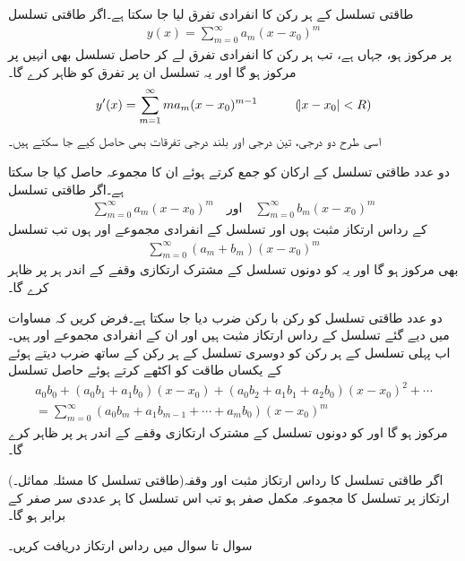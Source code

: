 \quad طاقتی تسلسل کے ہر رکن کا انفرادی تفرق لیا جا سکتا ہے۔اگر طاقتی تسلسل
\begin{align*}
y(x)=\sum_{m=0}^{\infty}a_m(x-x_0)^m
\end{align*}
  پر مرکوز ہو، جہاں  ہے، تب ہر رکن کا انفرادی تفرق لے کر حاصل تسلسل بھی انہیں  پر مرکوز ہو گا اور یہ تسلسل ان  پر  تفرق   کو ظاہر کرے گا۔ 
 \begin{align*}
y'(x)=\sum_{m=1}^{\infty} ma_m(x-x_0)^{m-1}\quad \quad \quad (\abs{x-x_0}<R)
\end{align*}
 اسی طرح دو درجی، تین درجی اور بلند درجی تفرقات بھی حاصل کیے جا سکتے ہیں۔

\quad دو عدد طاقتی تسلسل کے ارکان کو جمع کرتے ہوئے ان کا مجموعہ حاصل کیا جا سکتا ہے۔اگر طاقتی تسلسل
\begin{align}\label{مساوات_بیسل_دو_عدد_تسلسل_الف}
\sum_{m=0}^{\infty} a_m(x-x_0)^m\quad \text{اور} \quad \sum_{m=0}^{\infty} b_m(x-x_0)^m
\end{align}
کے رداس ارتکاز مثبت ہوں اور تسلسل کے انفرادی مجموعے  اور  ہوں تب تسلسل
\begin{align*}
\sum_{m=0}^{\infty} (a_m+b_m)(x-x_0)^m
\end{align*}
بھی مرکوز ہو گا اور یہ  کو  دونوں تسلسل کے مشترک ارتکازی وقفے کے اندر ہر  پر ظاہر کرے گا۔

\quad دو عدد طاقتی تسلسل کو رکن با رکن ضرب دیا جا سکتا ہے۔فرض کریں کہ مساوات  میں دیے گئے تسلسل کے رداس ارتکاز مثبت ہیں اور ان کے انفرادی مجموعے  اور  ہیں۔اب پہلی تسلسل کے ہر رکن کو دوسری تسلسل کے ہر رکن کے ساتھ ضرب دیتے ہوئے  کے یکساں طاقت کو اکٹھے کرتے ہوئے حاصل تسلسل
\begin{multline*}
a_0b_0+(a_0b_1+a_1b_0)(x-x_0)+(a_0b_2+a_1b_1+a_2b_0)(x-x_0)^2+\cdots\\
=\sum_{m=0}^{\infty} (a_0b_m+a_1b_{m-1}+\cdots+a_mb_0)(x-x_0)^m
\end{multline*}
مرکوز ہو گا اور  کو دونوں تسلسل کے مشترک ارتکازی وقفے کے اندر ہر  پر ظاہر کرے گا۔

 (طاقتی تسلسل کا مسئلہ  مماثل۔)\quad اگر طاقتی تسلسل کا رداس ارتکاز مثبت اور وقفہ ارتکاز پر تسلسل کا مجموعہ مکمل صفر ہو تب اس تسلسل کا ہر عددی سر صفر کے برابر ہو گا۔

سوال  تا سوال  میں رداس ارتکاز دریافت کریں۔

